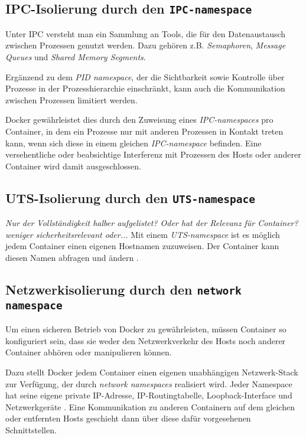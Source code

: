 \documentclass[../main.tex]{subfiles}
\begin{document}

			\cite[S.4]{dockerSec1}

    \subsection{\acrshort{IPC}-Isolierung durch den \texttt{\acrshort{IPC}-namespace}}
			Unter \acrshort{IPC} versteht man ein Sammlung an Tools, die für den Datenaustausch zwischen Prozessen genutzt werden. Dazu gehören z.B. \emph{Semaphoren}, \emph{Message Queues} und \emph{Shared Memory Segments}.

			Ergänzend zu dem \emph{\acrshort{PID} namespace}, der die Sichtbarkeit sowie Kontrolle über Prozesse in der Prozesshierarchie einschränkt, kann auch die Kommunikation zwischen Prozessen limitiert werden.

			Docker gewährleistet dies durch den Zuweisung eines \emph{\acrshort{IPC}-namespaces} pro Container, in dem ein Prozesse nur mit anderen Prozessen in Kontakt treten kann, wenn sich diese in einem gleichen \emph{\acrshort{IPC}-namespace} befinden. Eine versehentliche oder beabsichtige Interferenz mit Prozessen des Hosts oder anderer Container wird damit ausgeschlossen.

			\cite[S.4]{dockerSec1}

    \subsection{\acrshort{UTS}-Isolierung durch den \texttt{\acrshort{UTS}-namespace}}
			\emph{Nur der Vollständigkeit halber aufgelistet? Oder hat der Relevanz für Container?}
			\emph{weniger sicherheitsrelevant oder...}
			Mit einem \emph{\acrshort{UTS}-namespace} ist es möglich jedem Container einen eigenen Hostnamen zuzuweisen. Der Container kann diesen Namen abfragen und ändern \cite[S.3]{virtVSContainer}.
    \subsection{Netzwerkisolierung durch den \texttt{network namespace}}
			Um einen sicheren Betrieb von Docker zu gewährleisten, müssen Container so konfiguriert sein, dass sie weder den Netzwerkverkehr des Hosts noch anderer Container abhören oder manipulieren können.

			Dazu stellt Docker jedem Container einen eigenen unabhängigen Netzwerk-Stack zur Verfügung, der durch \emph{network namespaces} realisiert wird. Jeder Namespace hat seine eigene private IP-Adresse, IP-Routingtabelle, Loopback-Interface und Netzwerkgeräte \cite[S.2+3]{virtVSContainer}. Eine Kommunikation zu anderen Containern auf dem gleichen oder entfernten Hosts geschieht dann über diese dafür vorgesehenen Schnittstellen.
\end{document}
